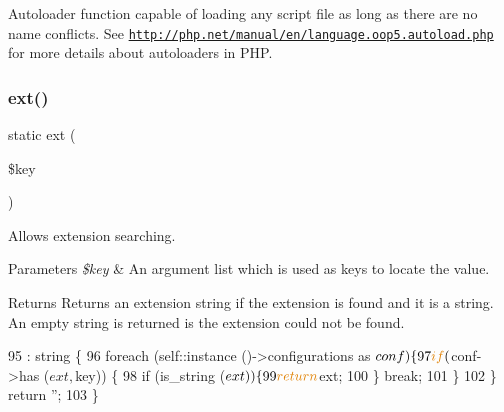 Autoloader function capable of loading any script file as long as there are no name conflicts. See \href{http://php.net/manual/en/language.oop5.autoload.php}{\tt http\+://php.\+net/manual/en/language.\+oop5.\+autoload.\+php} for more details about autoloaders in P\+HP. 
\mbox{\label{class_lora_1_1_config_a98a88f17bbc72a1f26f54b264be26068}} 
\subsubsection{\texorpdfstring{ext()}{ext()}}
{\footnotesize\ttfamily static ext (\begin{DoxyParamCaption}\item[{}]{\$key }\end{DoxyParamCaption})\hspace{0.3cm}{\ttfamily [static]}}

Allows extension searching. 
\begin{DoxyParams}{Parameters}
{\em \$key} & An argument list which is used as keys to locate the value. \\
\hline
\end{DoxyParams}
\begin{DoxyReturn}{Returns}
Returns an extension string if the extension is found and it is a string. An empty string is returned is the extension could not be found. 
\end{DoxyReturn}

\begin{DoxyCode}
95                                          : \textcolor{keywordtype}{string} \{
96         \textcolor{keywordflow}{foreach} (self::instance ()->configurations as $conf) \{
97             \textcolor{keywordflow}{if} ($conf->has ($ext, $key)) \{
98                 \textcolor{keywordflow}{if} (is\_string ($ext)) \{
99                     \textcolor{keywordflow}{return} $ext;
100                 \} \textcolor{keywordflow}{break};
101             \}
102         \} \textcolor{keywordflow}{return} \textcolor{stringliteral}{''};
103     \}
\end{DoxyCode}
\mbox{\label{class_lora_1_1_config_a9f949bb49001886679ff026aba1c3a5a}} 
